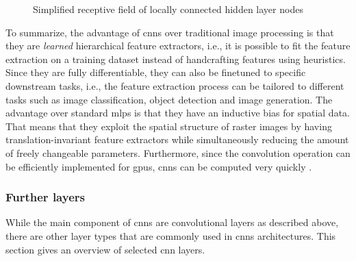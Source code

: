 \begin{figure}
    \caption{Simplified receptive field of locally connected hidden layer nodes}
    \label{fig:receptivefield}
\end{figure}

To summarize, the advantage of \glspl{cnn} over traditional image processing is that they are \emph{learned} hierarchical feature extractors, i.e., it is possible to fit the feature extraction on a training dataset instead of handcrafting features using heuristics. Since they are fully differentiable, they can also be finetuned to specific downstream tasks, i.e., the feature extraction process can be tailored to different tasks such as image classification, object detection and image generation. The advantage over standard \glspl{mlp} is that they have an inductive bias for spatial data. That means that they exploit the spatial structure of raster images by having translation-invariant feature extractors while simultaneously reducing the amount of freely changeable parameters. Furthermore, since the convolution operation can be efficiently implemented for \glspl{gpu}, \glspl{cnn} can be computed very quickly \citep{chellapilla:inria-00112631,DBLP:conf/cvpr/CiresanMS12,DBLP:conf/nips/KrizhevskySH12}.

\subsubsection{Further layers}
While the main component of \glspl{cnn} are convolutional layers as described above, there are other layer types that are commonly used in \glspl{cnn} architectures. This section gives an overview of selected \gls{cnn} layers.

